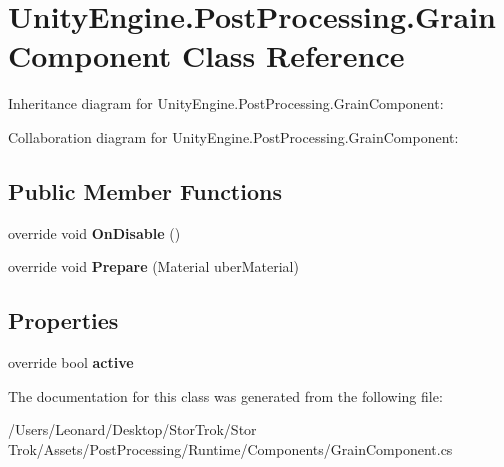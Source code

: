 \hypertarget{class_unity_engine_1_1_post_processing_1_1_grain_component}{}\section{Unity\+Engine.\+Post\+Processing.\+Grain\+Component Class Reference}
\label{class_unity_engine_1_1_post_processing_1_1_grain_component}


Inheritance diagram for Unity\+Engine.\+Post\+Processing.\+Grain\+Component\+:


Collaboration diagram for Unity\+Engine.\+Post\+Processing.\+Grain\+Component\+:
\subsection*{Public Member Functions}
\begin{DoxyCompactItemize}
\item 
\mbox{\label{class_unity_engine_1_1_post_processing_1_1_grain_component_a345fbfa8ab350022e79fbcae210c3210}} 
override void {\bfseries On\+Disable} ()
\item 
\mbox{\label{class_unity_engine_1_1_post_processing_1_1_grain_component_a6a1c8bf2f8d860c91df6cf012c63c27a}} 
override void {\bfseries Prepare} (Material uber\+Material)
\end{DoxyCompactItemize}
\subsection*{Properties}
\begin{DoxyCompactItemize}
\item 
\mbox{\label{class_unity_engine_1_1_post_processing_1_1_grain_component_adb5baf66470f91776c51124f01acb3e5}} 
override bool {\bfseries active}
\end{DoxyCompactItemize}


The documentation for this class was generated from the following file\+:\begin{DoxyCompactItemize}
\item 
/\+Users/\+Leonard/\+Desktop/\+Stor\+Trok/\+Stor Trok/\+Assets/\+Post\+Processing/\+Runtime/\+Components/Grain\+Component.\+cs\end{DoxyCompactItemize}
